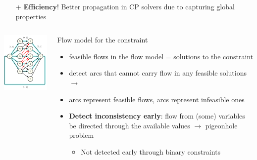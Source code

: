 \documentclass{cons-beamer}
\begin{document}
\begin{frame}
  \begin{itemize}
    \item[+] \textbf{Efficiency}! Better propagation in CP solvers due to capturing global properties \\ 
  \end{itemize}
  \vfill
  \begin{columns}
    \begin{column}{0.3\textwidth}
      \includegraphics[width=45mm]{images/flow_alldiff_only_graph.png} \\
    \end{column}
    \begin{column}{0.7\textwidth}
      Flow model for the  constraint
      \begin{itemize}
        \item feasible flows in the flow model = solutions to the constraint \vfill
        \item detect arcs that cannot carry flow in any feasible solutions $\rightarrow$  \vfill
        \item {} arcs represent feasible flows,  arcs represent infeasible ones \vfill
        \item \textbf{Detect inconsistency early}: flow from (some) variables  be directed through the available values $\rightarrow$ pigeonhole problem
        \begin{itemize}
          \item Not detected early through binary constraints \vfill
        \end{itemize}
      \end{itemize}
    \end{column}
  \end{columns}
\end{frame}
\end{document}
